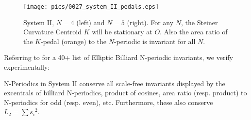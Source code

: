 \begin{figure}
    \centering
    \texttt{[image: pics/0027\_system\_II\_pedals.eps]}
    \caption{System II, $N=4$ (left) and $N=5$ (right). For any $N$, the Steiner Curvature Centroid $K$ will be stationary at $O$. Also the area ratio of the $K$-pedal (orange) to the $N$-periodic is invariant for all $N$.}
    \label{fig:II-krummungs}
\end{figure}

Referring to  \cite{reznik2020-forty} for a 40+ list of Elliptic Billiard N-periodic invariants, we verify experimentally:

\begin{conjecture}
N-Periodics in System II conserve all scale-free invariants displayed by the excentrals of billiard N-periodics, product of cosines, area ratio (resp. product) to N-periodics for odd (resp. even), etc. Furthermore, these also conserve $L_2=\sum{s_i}^2$.
\end{conjecture}